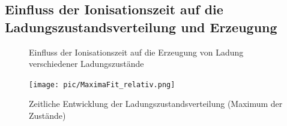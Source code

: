 	\subsection{Einfluss der Ionisationszeit auf die Ladungszustandsverteilung und Erzeugung}
        \begin{figure}[htbp]
            \caption{Einfluss der Ionisationszeit auf die Erzeugung von Ladung verschiedener Ladungszustände}
            \label{timed}
        \end{figure}
        \begin{figure}[htbp]
            \texttt{[image: pic/MaximaFit\_relativ.png]}
            \caption{Zeitliche Entwicklung der Ladungszustandsverteilung (Maximum der Zustände)}
        \end{figure} 
        
